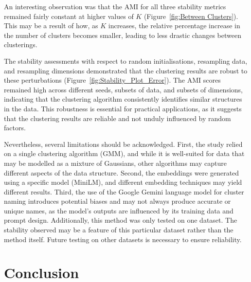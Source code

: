 \documentclass{article}
\begin{document}
An interesting observation was that the AMI for all three stability metrics remained fairly constant at higher values of \(K\) (Figure~\ref{fig:Between Clusters}). This may be a result of how, as \(K\) increases, the relative percentage increase in the number of clusters becomes smaller, leading to less drastic changes between clusterings.

The stability assessments with respect to random initialisations, resampling data, and resampling dimensions demonstrated that the clustering results are robust to these perturbations (Figure~\ref{fig:Stability_Plot_Error}). The AMI scores remained high across different seeds, subsets of data, and subsets of dimensions, indicating that the clustering algorithm consistently identifies similar structures in the data. This robustness is essential for practical applications, as it suggests that the clustering results are reliable and not unduly influenced by random factors.

Nevertheless, several limitations should be acknowledged. First, the study relied on a single clustering algorithm (GMM), and while it is well-suited for data that may be modelled as a mixture of Gaussians, other algorithms may capture different aspects of the data structure. Second, the embeddings were generated using a specific model (MiniLM), and different embedding techniques may yield different results. Third, the use of the Google Gemini language model for cluster naming introduces potential biases and may not always produce accurate or unique names, as the model's outputs are influenced by its training data and prompt design. Additionally, this method was only tested on one dataset. The stability observed may be a feature of this particular dataset rather than the method itself. Future testing on other datasets is necessary to ensure reliability.



\section{Conclusion}
\end{document}
